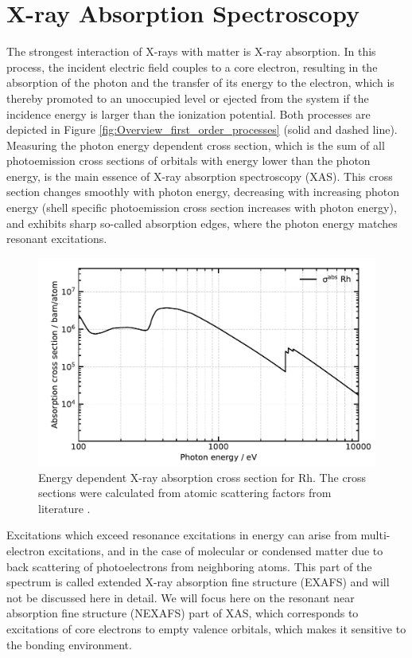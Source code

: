 \section{X-ray Absorption Spectroscopy}
The strongest interaction of X-rays with matter is X-ray absorption. In this process, the incident electric field couples to a core electron, resulting in the absorption of the photon and the transfer of its energy to the electron, which is thereby promoted to an unoccupied level or ejected from the system if the incidence energy is larger than the ionization potential. Both processes are depicted in Figure \ref{fig:Overview_first_order_processes} (solid and dashed line). Measuring the photon energy dependent cross section, which is the sum of all photoemission cross sections of orbitals with energy lower than the photon energy, is the main essence of X-ray absorption spectroscopy (XAS). This cross section changes smoothly with photon energy, decreasing with increasing photon energy (shell specific photoemission cross section increases with photon energy), and exhibits sharp so-called absorption edges, where the photon energy matches resonant excitations.
\begin{figure}[H]
    \centering
    \includegraphics[width=\linewidth]{Figures/Cross_section_Rh.pdf}
    \caption{Energy dependent X-ray absorption cross section for Rh. The cross sections were calculated from atomic scattering factors from literature \cite{henke1993x}.}
    \label{fig:Rh_Cross_section}
\end{figure}
\noindent
Excitations which exceed resonance excitations in energy can arise from multi-electron excitations, and in the case of molecular or condensed matter due to back scattering of photoelectrons from neighboring atoms. This part of the spectrum is called extended X-ray absorption fine structure (EXAFS) and will not be discussed here in detail. We will focus here on the resonant near absorption fine structure (NEXAFS) part of XAS, which corresponds to excitations of core electrons to empty valence orbitals, which makes it sensitive to the bonding environment. \\\
